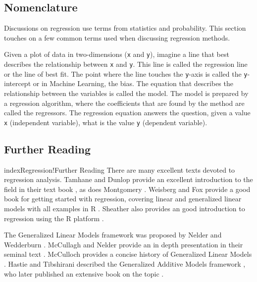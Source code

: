 \begin{bibunit}
\subsection{Nomenclature}
Discussions on regression use terms from statistics and probability. This section touches on a few common terms used when discussing regression methods.

Given a plot of data in two-dimensions (\texttt{x} and \texttt{y}), imagine a line that best describes the relationship between \texttt{x} and \texttt{y}. This line is called the regression line or the line of best fit. The point where the line touches the \texttt{y}-axis is called the \texttt{y}-intercept or in Machine Learning, the bias. The equation that describes the relationship between the variables is called the model. The model is prepared by a regression algorithm, where the coefficients that are found by the method are called the regressors. The regression equation answers the question, given a value \texttt{x} (independent variable), what is the value \texttt{y} (dependent variable).

\subsection{Further Reading}
index{Regression!Further Reading}
There are many excellent texts devoted to regression analysis.
Tamhane and Dunlop provide an excellent introduction to the field in their text book \cite{Tamhane2000}, as does Montgomery \cite{Montgomery2001}.
Weisberg and Fox provide a good book for getting started with regression, covering linear and generalized linear models with all examples in R \cite{Weisberg2010}. Sheather also provides an good introduction to regression using the R platform \cite{Sheather2009}.

The Generalized Linear Models framework was proposed by Nelder and Wedderburn \cite{Nelder1972}. McCullagh and Nelder provide an in depth presentation in their seminal text \cite{McCullagh1989}. McCulloch provides a concise history of Generalized Linear Models \cite{McCulloch2000}.
Hastie and Tibshirani described the Generalized Additive Models framework \cite{Hastie1986}, who later published an extensive book on the topic \cite{Hastie1990}.

\putbib
\end{bibunit}

